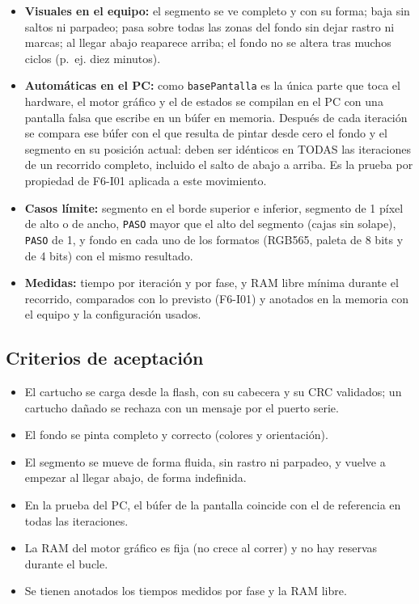 \begin{itemize}
	\item \textbf{Visuales en el equipo:} el segmento se ve completo y con su forma; baja sin saltos ni parpadeo; pasa sobre todas las zonas del fondo sin dejar rastro ni marcas; al llegar abajo reaparece arriba; el fondo no se altera tras muchos ciclos (p.~ej. diez minutos).
	\item \textbf{Automáticas en el PC:} como \texttt{basePantalla} es la única parte que toca el hardware, el motor gráfico y el de estados se compilan en el PC con una pantalla falsa que escribe en un búfer en memoria. Después de cada iteración se compara ese búfer con el que resulta de pintar desde cero el fondo y el segmento en su posición actual: deben ser idénticos en TODAS las iteraciones de un recorrido completo, incluido el salto de abajo a arriba. Es la prueba por propiedad de F6-I01 aplicada a este movimiento.
	\item \textbf{Casos límite:} segmento en el borde superior e inferior, segmento de 1 píxel de alto o de ancho, \texttt{PASO} mayor que el alto del segmento (cajas sin solape), \texttt{PASO} de 1, y fondo en cada uno de los formatos (RGB565, paleta de 8 bits y de 4 bits) con el mismo resultado.
	\item \textbf{Medidas:} tiempo por iteración y por fase, y RAM libre mínima durante el recorrido, comparados con lo previsto (F6-I01) y anotados en la memoria con el equipo y la configuración usados.
\end{itemize}

\subsection{Criterios de aceptación}
\label{sec:F6I02Criterios}

\begin{itemize}
	\item El cartucho se carga desde la flash, con su cabecera y su CRC validados; un cartucho dañado se rechaza con un mensaje por el puerto serie.
	\item El fondo se pinta completo y correcto (colores y orientación).
	\item El segmento se mueve de forma fluida, sin rastro ni parpadeo, y vuelve a empezar al llegar abajo, de forma indefinida.
	\item En la prueba del PC, el búfer de la pantalla coincide con el de referencia en todas las iteraciones.
	\item La RAM del motor gráfico es fija (no crece al correr) y no hay reservas durante el bucle.
	\item Se tienen anotados los tiempos medidos por fase y la RAM libre.
\end{itemize}

